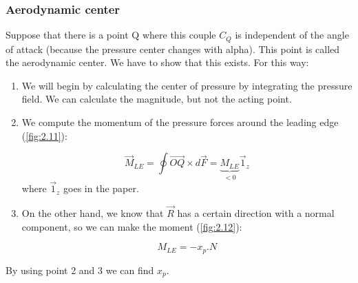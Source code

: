 				\subsubsection{Aerodynamic center}
					Suppose that there is a point Q where this couple $C_Q$ is independent of the angle of attack (because the pressure center changes with alpha). This point is called the aerodynamic center. We have to show that this exists. For this way:
					\begin{enumerate}
						\item We will begin by calculating the center of pressure by integrating the pressure field. We can calculate the magnitude, but not the acting point. 
						
						\item We compute the momentum of the pressure forces around the leading edge (\autoref{fig:2.11}):
						
						\begin{equation}
						\vec{M}_{LE} = \oint \vec{OQ} \times d\vec{F} = \underbrace{M_{LE}}_{<0} \vec{1}_z 
						\end{equation}
						where $\vec{1}_z$ goes in the paper. 						
						
						\item On the other hand, we know that $\vec{R}$ has a certain direction with a normal component, so we can make the moment (\autoref{fig:2.12}): 
						
						\begin{equation}
						M_{LE} = -x_p.N
						\end{equation}
					\end{enumerate}
					
					By using point 2 and 3 we can find $x_{p}$.
					
